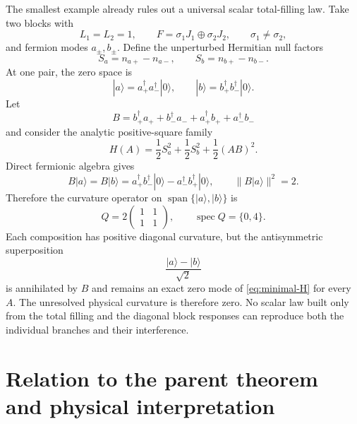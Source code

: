 \documentclass[11pt]{article}
\numberwithin{equation}{section}
\newcommand{\Span}{\operatorname{span}}
\newcommand{\spec}{\operatorname{spec}}
\begin{document}
The smallest example already rules out a universal scalar total-filling law.  Take two blocks with
\begin{equation}
 L_1=L_2=1,
 \qquad
 F=\sigma_1J_1\oplus\sigma_2J_2,
 \qquad
 \sigma_1\ne\sigma_2,
 \label{eq:minimal-F}
\end{equation}
and fermion modes $a_\pm,b_\pm$.  Define the unperturbed Hermitian null factors
\begin{equation}
 S_a=n_{a+}-n_{a-},
 \qquad
 S_b=n_{b+}-n_{b-}.
 \label{eq:minimal-S}
\end{equation}
At one pair, the zero space is
\begin{equation}
 |a\rangle=a_+^\dagger a_-^\dagger|0\rangle,
 \qquad
 |b\rangle=b_+^\dagger b_-^\dagger|0\rangle.
 \label{eq:minimal-basis}
\end{equation}
Let
\begin{equation}
 B=b_+^\dagger a_++b_-^\dagger a_-
 +a_+^\dagger b_++a_-^\dagger b_-
 \label{eq:minimal-B}
\end{equation}
and consider the analytic positive-square family
\begin{equation}
 H(A)=\frac12S_a^2+\frac12S_b^2+\frac12(AB)^2.
 \label{eq:minimal-H}
\end{equation}
Direct fermionic algebra gives
\begin{equation}
 B|a\rangle=B|b\rangle
 =a_+^\dagger b_-^\dagger|0\rangle
 -a_-^\dagger b_+^\dagger|0\rangle,
 \qquad
 \|B|a\rangle\|^2=2.
 \label{eq:minimal-action}
\end{equation}
Therefore the curvature operator on $\Span\{|a\rangle,|b\rangle\}$ is
\begin{equation}
 Q=2
 \begin{pmatrix}
 1&1\\
 1&1
 \end{pmatrix},
 \qquad
 \spec Q=\{0,4\}.
 \label{eq:minimal-Q}
\end{equation}
Each composition has positive diagonal curvature, but the antisymmetric superposition
\begin{equation}
 \frac{|a\rangle-|b\rangle}{\sqrt2}
 \label{eq:minimal-dark}
\end{equation}
is annihilated by $B$ and remains an exact zero mode of \eqref{eq:minimal-H} for every $A$.  The unresolved physical curvature is therefore zero.  No scalar law built only from the total filling and the diagonal block responses can reproduce both the individual branches and their interference.

\section{Relation to the parent theorem and physical interpretation}
\end{document}
